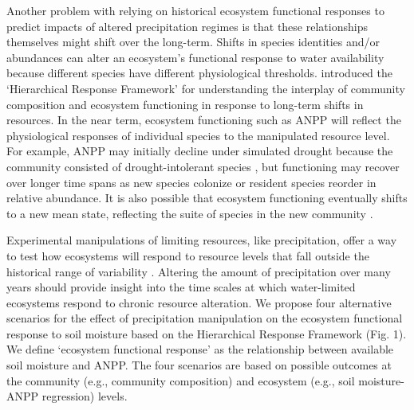 \documentclass[fleqn,10pt,lineno]{wlpeerj} %
\begin{document}
Another problem with relying on historical ecosystem functional
responses to predict impacts of altered precipitation regimes is that
these relationships themselves might shift over the long-term. Shifts in
species identities and/or abundances can alter an ecosystem's functional
response to water availability because different species have different
physiological thresholds. \citet{Smith2009} introduced the `Hierarchical
Response Framework' for understanding the interplay of community
composition and ecosystem functioning in response to long-term shifts in
resources. In the near term, ecosystem functioning such as ANPP will
reflect the physiological responses of individual species to the
manipulated resource level. For example, ANPP may initially decline
under simulated drought because the community consisted of
drought-intolerant species \citep{Hoover2014}, but functioning may
recover over longer time spans as new species colonize or resident
species reorder in relative abundance. It is also possible that
ecosystem functioning eventually shifts to a new mean state, reflecting
the suite of species in the new community \citep{Knapp2012}.

Experimental manipulations of limiting resources, like precipitation,
offer a way to test how ecosystems will respond to resource levels that
fall outside the historical range of variability
\citep{Avolio2015, Gherardi2015, Knapp2017}. Altering the amount of
precipitation over many years should provide insight into the time
scales at which water-limited ecosystems respond to chronic resource
alteration. We propose four alternative scenarios for the effect of
precipitation manipulation on the ecosystem functional response to soil
moisture based on the Hierarchical Response Framework (Fig. 1). We
define `ecosystem functional response' as the relationship between
available soil moisture and ANPP.
The four scenarios are based on possible outcomes at the community
(e.g., community composition) and ecosystem (e.g., soil moisture-ANPP
regression) levels.
\end{document}
